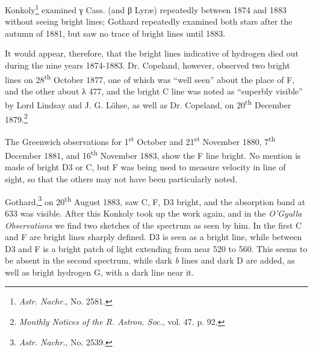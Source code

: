 \documentclass[a4paper, 12pt, oneside, polutonikogreek, english]{article}
\begin{document}
Konkoly\footnote{\emph{Astr. Nachr.}, No. 2581.} examined γ Cass. (and β Lyræ) repeatedly between 1874 and 1883 without seeing bright lines; Gothard repeatedly examined both stars after the autumn of 1881, but saw no trace of bright lines until 1883.

It would appear, therefore, that the bright lines indicative of hydrogen died out during the nine years 1874-1883. Dr. Copeland, however, observed two bright lines on 28\textsuperscript{th} October 1877, one of which was ``well seen'' about the place of F, and the other about λ 477, and the bright C line was noted as ``superbly visible'' by Lord Lindsay and J. G. Löhse, as well as Dr. Copeland, on 20\textsuperscript{th} December 1879.\footnote{\emph{Monthly Notices of the R. Astron. Soc.}, vol. 47. p. 92.}

The Greenwich observations for 1\textsuperscript{st} October and 21\textsuperscript{st} November 1880, 7\textsuperscript{th} December 1881, and 16\textsuperscript{th} November 1883, show the F line bright. No mention is made of bright D3 or C, but F was being used to measure velocity in line of sight, so that the others may not have been particularly noted.

Gothard,\footnote{\emph{Astr. Nachr.}, No. 2539.} on 20\textsuperscript{th} August 1883, saw C, F, D3 bright, and the absorption band at 633 was visible. After this Konkoly took up the work again, and in the \emph{O'Gyalla Observations} we find two sketches of the spectrum as seen by him. In the first C and F are bright lines sharply defined. D3 is seen as a bright line, while between D3 and F is a bright patch of light extending from near 520 to 560. This seems to be absent in the second spectrum, while dark \emph{b} lines and dark D are added, as well as bright hydrogen G, with a dark line near it.
\end{document}

